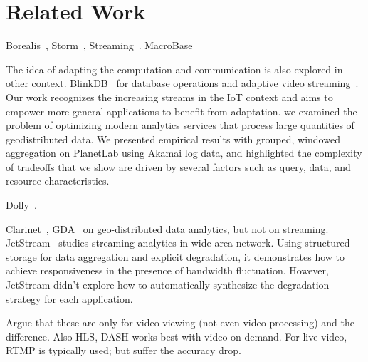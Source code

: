 \section{Related Work}
\label{sec:related-work}

 Borealis~\cite{abadi2005design},
Storm~\cite{toshniwal2014storm}, Streaming~\cite{zaharia2013discretized}.
MacroBase

 The idea of adapting the computation and
communication is also explored in other
context. BlinkDB~\cite{agarwal2013blinkdb} for database operations and adaptive
video streaming~\cite{yin2015control}. Our work recognizes the increasing
streams in the IoT context and aims to empower more general applications to
benefit from adaptation. \cite{heintz2015towards} we examined the problem of
optimizing modern analytics services that process large quantities of
geodistributed data. We presented empirical results with grouped, windowed
aggregation on PlanetLab using Akamai log data, and highlighted the complexity
of tradeoffs that we show are driven by several factors such as query, data, and
resource characteristics.

 Dolly~\cite{ananthanarayanan2013effective}.

 Clarinet~\cite{viswanathan2016clarinet}, GDA~\cite{pu2015low}
on geo-distributed data analytics, but not on
streaming. JetStream~\cite{rabkin2014aggregation} studies streaming analytics in
wide area network. Using structured storage for data aggregation and explicit
degradation, it demonstrates how to achieve responsiveness in the presence of
bandwidth fluctuation. However, JetStream didn't explore how to automatically
synthesize the degradation strategy for each application.

 Argue that these are only for video viewing (not even
video processing) and the difference. Also HLS, DASH works best with
video-on-demand. For live video, RTMP is typically used; but suffer the accuracy
drop.

